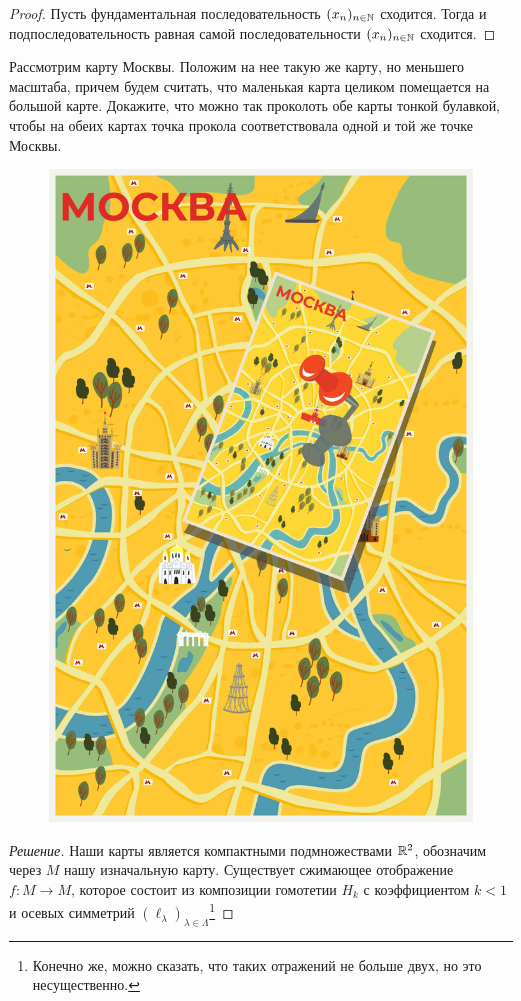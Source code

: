 \documentclass[10pt]{article}
\begin{document}
\begin{tasks}
\begin{proof}
        Пусть фундаментальная последовательность $(x_n)_{n\in\mathbb N}$ сходится. Тогда и подпоследовательность равная самой последовательности $(x_n)_{n\in\mathbb N}$ сходится.
    \end{proof}

    \item Рассмотрим карту Москвы. Положим на нее такую же карту, но меньшего масштаба, причем будем считать, что маленькая карта целиком помещается на большой карте. Докажите, что можно так проколоть обе карты тонкой булавкой, чтобы на обеих картах точка прокола соответствовала одной и той же точке Москвы.
    \begin{figure}[ht]
        \centering
        \includegraphics[width=0.5\linewidth]{../graphics/карта мск_Монтажная область 1.jpg}
    \end{figure}

    \begin{proof}
        [Решение]
        Наши карты является компактными подмножествами $\mathbb R^2$, обозначим через $M$ нашу изначальную карту. Существует сжимающее отображение $f\colon M \to M$, которое состоит из композиции гомотетии $H_k$ с коэффициентом $k < 1$ и осевых симметрий $(\ell_\lambda)_{\lambda\in\Lambda}$\footnote{Конечно же, можно сказать, что таких отражений не больше двух, но это несущественно.}


\end{proof}
\end{tasks}
\end{document}
